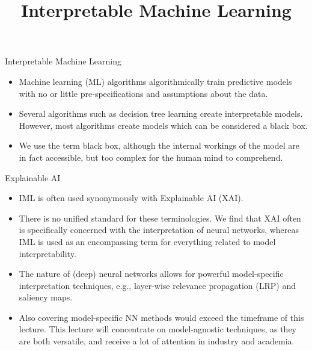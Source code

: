\documentclass[11pt,compress,t,notes=noshow, xcolor=table]{beamer}
\title{Interpretable Machine Learning}
\institute{\href{https://compstat-lmu.github.io/lecture_iml/}{compstat-lmu.github.io/lecture\_iml}}
\date{}
\begin{document}


\newcommand{\titlefigure}{figure/open_blackbox}
\newcommand{\learninggoals}{
\item What is interpretable machine learning (IML) and Explainable Artificial Intelligence (XAI)?
\item What is interpretability?
\item What are the fundamental terms and concepts of IML?}


\begin{vbframe}{Interpretable Machine Learning}
\begin{itemize}
\itemsep2em
\item Machine learning (ML) algorithms algorithmically train predictive models with no or little pre-specifications and assumptions about the data.
\item Several algorithms such as decision tree learning create interpretable models. However, most algorithms create models which can be considered a black box.
\item We use the term black box, although the internal workings of the model are in fact accessible, but too complex for the human mind to comprehend.
\end{itemize}
\end{vbframe}

\begin{vbframe}{Explainable AI}
\begin{itemize}
\itemsep1em
\item IML is often used synonymously with Explainable AI (XAI). 
\item There is no unified standard for these terminologies. We find that XAI often is specifically concerned with the interpretation of neural networks, whereas IML is used as an encompassing term for everything related to model interpretability.
\item The nature of (deep) neural networks allows for powerful model-specific interpretation techniques, e.g., layer-wise relevance propagation (LRP) and saliency maps.
\item Also covering model-specific NN methods would exceed the timeframe of this lecture. This lecture will concentrate on model-agnostic techniques, as they are both versatile, and receive a lot of attention in industry and academia.
\end{itemize}
\end{vbframe}
\end{document}
